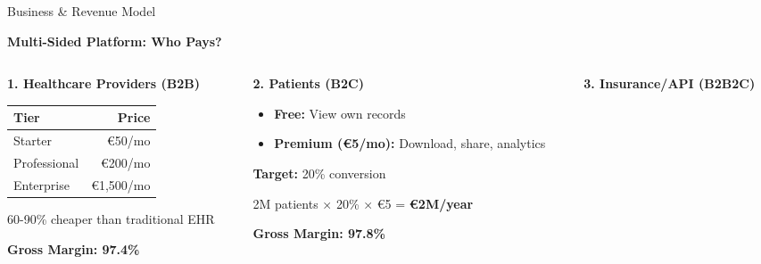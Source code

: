 \documentclass[aspectratio=169,xcolor=dvipsnames,20pt]{beamer}
\begin{document}
\begin{frame}{Business \& Revenue Model}

  \textbf{\textcolor{FadjmaBlue}{Multi-Sided Platform: Who Pays?}}

  \begin{columns}[T]
    \begin{column}{0.33\textwidth}
      \textbf{1. Healthcare Providers (B2B)}

      \begin{table}
        \scriptsize
        \begin{tabular}{lr}
          \toprule
          \textbf{Tier} & \textbf{Price} \\
          \midrule
          Starter & €50/mo \\
          Professional & €200/mo \\
          Enterprise & €1,500/mo \\
          \bottomrule
        \end{tabular}
      \end{table}

      \vspace{0.2cm}

      \textcolor{SuccessGreen}{60-90\% cheaper} than traditional EHR

      \textbf{Gross Margin: 97.4\%}
    \end{column}

    \begin{column}{0.33\textwidth}
      \textbf{2. Patients (B2C)}

      \begin{itemize}
        \item \textbf{Free:} View own records
        \item \textbf{Premium (€5/mo):} Download, share, analytics
      \end{itemize}

      \vspace{0.2cm}

      \textbf{Target:} 20\% conversion

      2M patients × 20\% × €5 = \textbf{€2M/year}

      \textbf{Gross Margin: 97.8\%}
    \end{column}

    \begin{column}{0.33\textwidth}
      \textbf{3. Insurance/API (B2B2C)}


\end{column}
\end{columns}
\end{frame}
\end{document}
